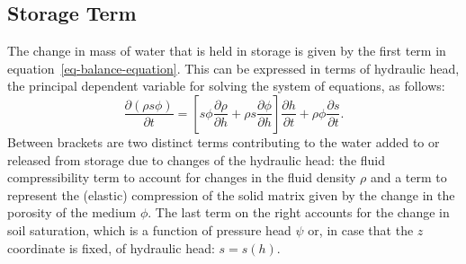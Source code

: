 \documentclass[fleqn]{article}
\begin{document}
\subsection{Storage Term}
The change in mass of water that is held in storage is given by the first 
term in equation~\ref{eq-balance-equation}. This can be expressed in terms 
of hydraulic head, the principal dependent variable for solving the system
of equations, as follows:
\begin{equation}
  \frac{\partial (\rho s \phi)}{\partial t} =
  \left[
    s \phi \frac{\partial \rho}{\partial h} +
    \rho s \frac{\partial \phi}{\partial h}
    \right]
  \frac{\partial h}{\partial t} +  
  \rho \phi \frac{\partial s}{\partial t}.
  \label{eq-sto-terms}
\end{equation}
Between brackets are two distinct terms contributing to the water
added to or released from storage due to changes of the hydraulic
head: the fluid compressibility term to account for changes in the
fluid density $\rho$ and a term to represent the (elastic)
compression of the solid matrix given by the change in the porosity
of the medium $\phi$. The last term on the right accounts for the
change in soil saturation, which is a function of pressure head $\psi$ 
or, in case that the $z$ coordinate is fixed, of hydraulic 
head: $s = s(h)$.
\end{document}
